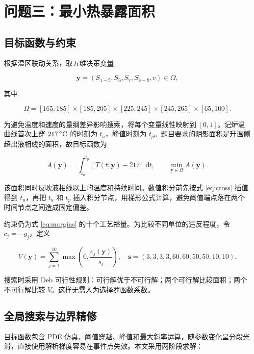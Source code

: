 \section{问题三：最小热暴露面积}

\subsection{目标函数与约束}

根据温区联动关系，取五维决策变量

\begin{equation}
  \bm y=(S_{1-5},S_6,S_7,S_{8-9},v)\in\Omega,
\end{equation}

其中

\begin{equation}
  \Omega=[165,185]\times[185,205]\times[225,245]
  \times[245,265]\times[65,100].
  \label{eq:omega}
\end{equation}

为避免温度和速度的量纲差异影响搜索，将每个变量线性映射到 $[0,1]$。记炉温曲线首次上穿 $217\,^{\circ}\mathrm{C}$ 的时刻为 $t_u$，峰值时刻为 $t_p$。题目要求的阴影面积是升温侧超出液相线的面积，故目标函数为

\begin{equation}
  A(\bm y)=\int_{t_u}^{t_p}[T(t;\bm y)-217]\,\mathrm dt,
  \qquad \min_{\bm y\in\Omega}A(\bm y).
  \label{eq:q3obj}
\end{equation}

该面积同时反映液相线以上的温度和持续时间。数值积分前先按式 \eqref{eq:cross} 插值得到 $t_u$，再把 $t_u$ 和 $t_p$ 插入积分节点，用梯形公式计算，避免阈值端点落在两个时间节点之间造成固定偏差。

约束仍为式 \eqref{eq:margins} 的十个工艺裕量。为比较不同单位的违反程度，令 $c_j=-g_j$，定义

\begin{equation}
  V(\bm y)=\sum_{j=1}^{10}\max\left(0,\frac{c_j(\bm y)}{s_j}\right),
  \quad
  \bm s=(3,3,3,3,60,60,50,50,10,10).
  \label{eq:V}
\end{equation}

搜索时采用 Deb 可行性规则\cite{deb2000}：可行解优于不可行解；两个可行解比较面积；两个不可行解比较 $V$。这样无需人为选择罚函数系数。

\subsection{全局搜索与边界精修}

目标函数包含 PDE 仿真、阈值穿越、峰值和最大斜率运算，随参数变化呈分段光滑，直接使用解析梯度容易在事件点失效。本文采用两阶段求解：

